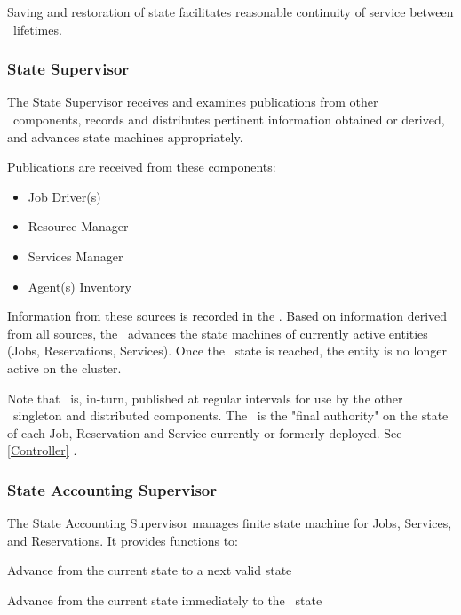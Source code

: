\begin{itemize}
    Saving and restoration of state facilitates reasonable continuity of service
    between \varOrchestrator~lifetimes.
    
    \subsubsection{State Supervisor} 

    The State Supervisor receives and examines publications from other
    \varDUCC~components, records and distributes pertinent information obtained
    or derived, and advances state machines appropriately.
    
    Publications are received from these components:
    
    \begin{itemize}
    
    \item Job Driver(s)
    \item Resource Manager
    \item Services Manager
    \item Agent(s) Inventory
      
    \end{itemize} 
    
    Information from these sources is recorded in the \varORmap. 
    Based on information derived from all sources, the 
    \varOrchestrator~advances the state machines of currently active 
    entities (Jobs, Reservations, Services). 
    Once the \varCompleted~state is reached, the
    entity is no longer active on the cluster.
    
    Note that \varORmap~is, in-turn, published at regular intervals 
    for use by the other \varDUCC~singleton and distributed components.
    The \varORmap~is the "final authority" on the state of
    each Job, Reservation and Service currently or formerly deployed.
    See \ref{Controller} \varController.
    
    \subsubsection{State Accounting Supervisor} 
        
    The State Accounting Supervisor manages finite state machine for 
    Jobs, Services, and Reservations. It provides functions to:
    
    \begin{description}
    
    \item Advance from the current state to a next valid state
    \item Advance from the current state immediately to the \varCompleted~state
          

\end{description}
\end{itemize}
